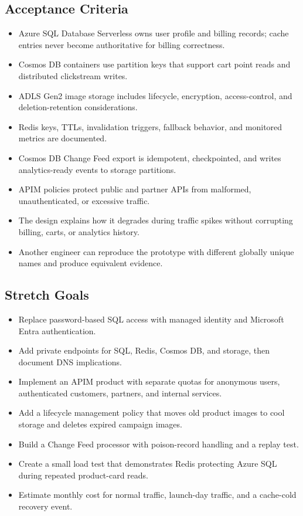 \subsection*{Acceptance Criteria}
\begin{itemize}
    \item Azure SQL Database Serverless owns user profile and billing records; cache entries never become authoritative for billing correctness.
    \item Cosmos DB containers use partition keys that support cart point reads and distributed clickstream writes.
    \item ADLS Gen2 image storage includes lifecycle, encryption, access-control, and deletion-retention considerations.
    \item Redis keys, TTLs, invalidation triggers, fallback behavior, and monitored metrics are documented.
    \item Cosmos DB Change Feed export is idempotent, checkpointed, and writes analytics-ready events to storage partitions.
    \item APIM policies protect public and partner APIs from malformed, unauthenticated, or excessive traffic.
    \item The design explains how it degrades during traffic spikes without corrupting billing, carts, or analytics history.
    \item Another engineer can reproduce the prototype with different globally unique names and produce equivalent evidence.
\end{itemize}

\subsection*{Stretch Goals}
\begin{itemize}
    \item Replace password-based SQL access with managed identity and Microsoft Entra authentication.
    \item Add private endpoints for SQL, Redis, Cosmos DB, and storage, then document DNS implications.
    \item Implement an APIM product with separate quotas for anonymous users, authenticated customers, partners, and internal services.
    \item Add a lifecycle management policy that moves old product images to cool storage and deletes expired campaign images.
    \item Build a Change Feed processor with poison-record handling and a replay test.
    \item Create a small load test that demonstrates Redis protecting Azure SQL during repeated product-card reads.
    \item Estimate monthly cost for normal traffic, launch-day traffic, and a cache-cold recovery event.
\end{itemize}
